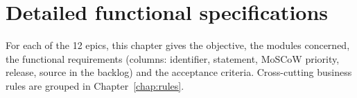 \chapter{Detailed functional specifications}\label{chap:specs}

For each of the 12 epics, this chapter gives the objective, the modules concerned, the functional requirements (columns: identifier, statement, MoSCoW priority, release, source in the backlog) and the acceptance criteria. Cross-cutting business rules are grouped in Chapter~\ref{chap:rules}.





